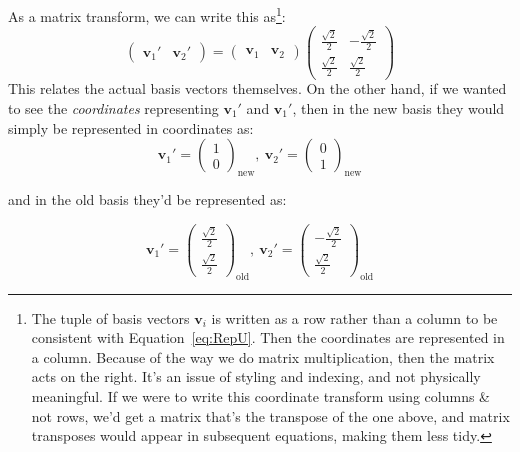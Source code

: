 \documentclass[../master.tex]{subfiles}
\begin{document}
	
	As a matrix transform, we can write this as\footnote{The tuple of basis vectors $\mathbf v_i$ is written as a row rather than a column to be consistent with Equation~\eqref{eq:RepU}. Then the coordinates are represented in a column. Because of the way we do matrix multiplication, then the matrix acts on the right. It's an issue of styling and indexing, and not physically meaningful. If we were to write this coordinate transform using columns \& not rows, we'd get a matrix that's the transpose of the one above, and matrix transposes would appear in subsequent equations, making them less tidy.}:
	\begin{equation*}
		\begin{pmatrix}
			\mathbf v_1' & \mathbf v_2'
		\end{pmatrix}
		= 
		\begin{pmatrix}
			\mathbf v_1 & \mathbf v_2
		\end{pmatrix}
		\begin{pmatrix}
					 \frac{\sqrt 2}{2} &  -\frac{\sqrt 2}{2} \\
					 \frac{\sqrt 2}{2} &  \frac{\sqrt 2}{2}
		\end{pmatrix}
	\end{equation*}
	This relates the actual basis vectors themselves. On the other hand, if we wanted to see the \emph{coordinates} representing $\mathbf v_1'$ and $\mathbf v_1'$, then in the new basis they would simply be represented in coordinates as: 
	\begin{equation*}
		\mathbf v_1' = \begin{pmatrix}
			1 \\ 0
		\end{pmatrix}_{\mathrm{new}}, ~
		\mathbf v_2' = \begin{pmatrix}
			0 \\ 1
		\end{pmatrix}_{\mathrm{new}}
	\end{equation*}
	
	and in the old basis they'd be represented as:
	
	\begin{equation*}
		\mathbf v_1' = \begin{pmatrix}
			\frac{\sqrt 2}{2} \\ \frac{\sqrt 2}{2}
		\end{pmatrix}_{\mathrm{old}}, ~
		\mathbf v_2' = \begin{pmatrix}
			-\frac{\sqrt 2}{2} \\ \frac{\sqrt 2}{2}
		\end{pmatrix}_{\mathrm{old}}
	\end{equation*}
		
\end{document}
